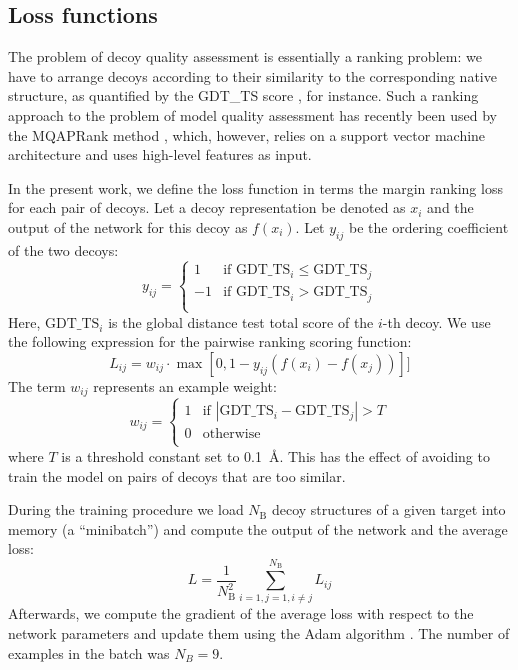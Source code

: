 \subsection{Loss functions}
The problem of decoy quality assessment is essentially a ranking
problem: we have to arrange decoys according to their similarity to
the corresponding native structure, as quantified by the GDT\_TS score
\cite{zemla2001casp4}, for instance. Such a ranking approach to the
problem of model quality assessment has recently been used by the
MQAPRank method \cite{jing2016sorting}, which, however, relies on a
support vector machine architecture and uses high-level features as
input.

In the present work, we define the loss function in terms the margin
ranking loss for each pair of decoys. Let a decoy representation be
denoted as $x_i$ and the output of the network for this decoy as
$f(x_i)$. Let $y_{ij}$ be the ordering coefficient of the two decoys:
$$
y_{ij} = \begin{cases}
               1& \text{if }\text{GDT\_TS}_i \leq \text{GDT\_TS}_j \\
               -1& \text{if }\text{GDT\_TS}_i > \text{GDT\_TS}_j \\
            \end{cases}
$$
%
Here, $\text{GDT\_TS}_i$ is the global distance test total score of
the $i$-th decoy. We use the following expression for the pairwise
ranking scoring function:
$$
L_{ij} = w_{ij} \cdot \max \left[ 0, 1 - y_{ij} \left( f \left( x_i \right) - f \left( x_j \right) \right) \right]]
$$
%
The term $w_{ij}$ represents an example weight:
%
$$
w_{ij} = \begin{cases}
               1& \text{if } \left| \text{GDT\_TS}_i - \text{GDT\_TS}_j \right| > T \\
               0& \text{otherwise} \\ 
            \end{cases}
$$
%
where $T$ is a threshold constant set to 0.1~{\AA}. This has the
effect of avoiding to train the model on pairs of decoys that are too
similar.

During the training procedure we load $N_\text{B}$ decoy structures of
a given target into memory (a ``minibatch'') and compute the output of the
network and the average loss:
$$ L = \frac{1}{N^{2}_\text{B}} \sum_{i=1,j=1, i \neq j}^{N_\text{B}} L_{ij} $$
Afterwards, we compute the gradient of the average loss with respect
to the network parameters and update them using the Adam algorithm
\cite{kingma2014adam}. The number of examples in the batch was $N_B = 9$.


